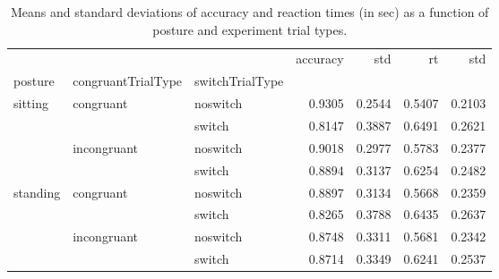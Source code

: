\begin{table}
\centering
\caption{Means and standard deviations of accuracy and reaction times (in sec) as a function of posture and experiment trial types.}
\label{table-task-switching-replication-reaction-time}
\begin{tabular}{lllrrrr}
\toprule
         &             &        & accuracy &    std &     rt &    std \\
posture & congruantTrialType & switchTrialType &          &        &        &        \\
\midrule
sitting & congruant & noswitch &   0.9305 & 0.2544 & 0.5407 & 0.2103 \\
         &             & switch &   0.8147 & 0.3887 & 0.6491 & 0.2621 \\
         & incongruant & noswitch &   0.9018 & 0.2977 & 0.5783 & 0.2377 \\
         &             & switch &   0.8894 & 0.3137 & 0.6254 & 0.2482 \\
standing & congruant & noswitch &   0.8897 & 0.3134 & 0.5668 & 0.2359 \\
         &             & switch &   0.8265 & 0.3788 & 0.6435 & 0.2637 \\
         & incongruant & noswitch &   0.8748 & 0.3311 & 0.5681 & 0.2342 \\
         &             & switch &   0.8714 & 0.3349 & 0.6241 & 0.2537 \\
\bottomrule
\end{tabular}
\end{table}
